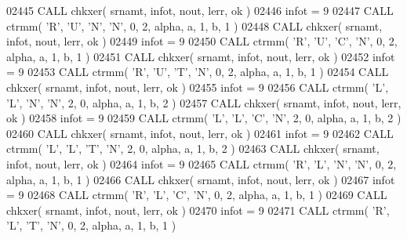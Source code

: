 \begin{DoxyCode}
02445       \textcolor{keyword}{CALL }chkxer( srnamt, infot, nout, lerr, ok )
02446       infot = 9
02447       \textcolor{keyword}{CALL }ctrmm( \textcolor{stringliteral}{'R'}, \textcolor{stringliteral}{'U'}, \textcolor{stringliteral}{'N'}, \textcolor{stringliteral}{'N'}, 0, 2, alpha, a, 1, b, 1 )
02448       \textcolor{keyword}{CALL }chkxer( srnamt, infot, nout, lerr, ok )
02449       infot = 9
02450       \textcolor{keyword}{CALL }ctrmm( \textcolor{stringliteral}{'R'}, \textcolor{stringliteral}{'U'}, \textcolor{stringliteral}{'C'}, \textcolor{stringliteral}{'N'}, 0, 2, alpha, a, 1, b, 1 )
02451       \textcolor{keyword}{CALL }chkxer( srnamt, infot, nout, lerr, ok )
02452       infot = 9
02453       \textcolor{keyword}{CALL }ctrmm( \textcolor{stringliteral}{'R'}, \textcolor{stringliteral}{'U'}, \textcolor{stringliteral}{'T'}, \textcolor{stringliteral}{'N'}, 0, 2, alpha, a, 1, b, 1 )
02454       \textcolor{keyword}{CALL }chkxer( srnamt, infot, nout, lerr, ok )
02455       infot = 9
02456       \textcolor{keyword}{CALL }ctrmm( \textcolor{stringliteral}{'L'}, \textcolor{stringliteral}{'L'}, \textcolor{stringliteral}{'N'}, \textcolor{stringliteral}{'N'}, 2, 0, alpha, a, 1, b, 2 )
02457       \textcolor{keyword}{CALL }chkxer( srnamt, infot, nout, lerr, ok )
02458       infot = 9
02459       \textcolor{keyword}{CALL }ctrmm( \textcolor{stringliteral}{'L'}, \textcolor{stringliteral}{'L'}, \textcolor{stringliteral}{'C'}, \textcolor{stringliteral}{'N'}, 2, 0, alpha, a, 1, b, 2 )
02460       \textcolor{keyword}{CALL }chkxer( srnamt, infot, nout, lerr, ok )
02461       infot = 9
02462       \textcolor{keyword}{CALL }ctrmm( \textcolor{stringliteral}{'L'}, \textcolor{stringliteral}{'L'}, \textcolor{stringliteral}{'T'}, \textcolor{stringliteral}{'N'}, 2, 0, alpha, a, 1, b, 2 )
02463       \textcolor{keyword}{CALL }chkxer( srnamt, infot, nout, lerr, ok )
02464       infot = 9
02465       \textcolor{keyword}{CALL }ctrmm( \textcolor{stringliteral}{'R'}, \textcolor{stringliteral}{'L'}, \textcolor{stringliteral}{'N'}, \textcolor{stringliteral}{'N'}, 0, 2, alpha, a, 1, b, 1 )
02466       \textcolor{keyword}{CALL }chkxer( srnamt, infot, nout, lerr, ok )
02467       infot = 9
02468       \textcolor{keyword}{CALL }ctrmm( \textcolor{stringliteral}{'R'}, \textcolor{stringliteral}{'L'}, \textcolor{stringliteral}{'C'}, \textcolor{stringliteral}{'N'}, 0, 2, alpha, a, 1, b, 1 )
02469       \textcolor{keyword}{CALL }chkxer( srnamt, infot, nout, lerr, ok )
02470       infot = 9
02471       \textcolor{keyword}{CALL }ctrmm( \textcolor{stringliteral}{'R'}, \textcolor{stringliteral}{'L'}, \textcolor{stringliteral}{'T'}, \textcolor{stringliteral}{'N'}, 0, 2, alpha, a, 1, b, 1 )

\end{DoxyCode}
